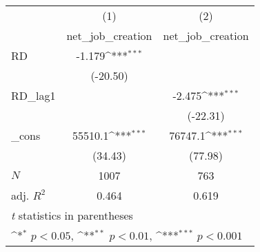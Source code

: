 \documentclass[12pt,english]{article}
\begin{document}
{
\def\sym#1{\ifmmode^{#1}\else\(^{#1}\)\fi}
\begin{tabular}{l*{2}{c}}
\hline\hline
            &\multicolumn{1}{c}{(1)}&\multicolumn{1}{c}{(2)}\\
            &\multicolumn{1}{c}{net\_job\_creation}&\multicolumn{1}{c}{net\_job\_creation}\\
\hline
RD          &      -1.179\sym{***}&                     \\
            &    (-20.50)         &                     \\
[1em]
RD\_lag1     &                     &      -2.475\sym{***}\\
            &                     &    (-22.31)         \\
[1em]
\_cons      &     55510.1\sym{***}&     76747.1\sym{***}\\
            &     (34.43)         &     (77.98)         \\
\hline
\(N\)       &        1007         &         763         \\
adj. \(R^{2}\)&       0.464         &       0.619         \\
\hline\hline
\multicolumn{3}{l}{\footnotesize \textit{t} statistics in parentheses}\\
\multicolumn{3}{l}{\footnotesize \sym{*} \(p<0.05\), \sym{**} \(p<0.01\), \sym{***} \(p<0.001\)}\\
\end{tabular}
}
\end{document}
